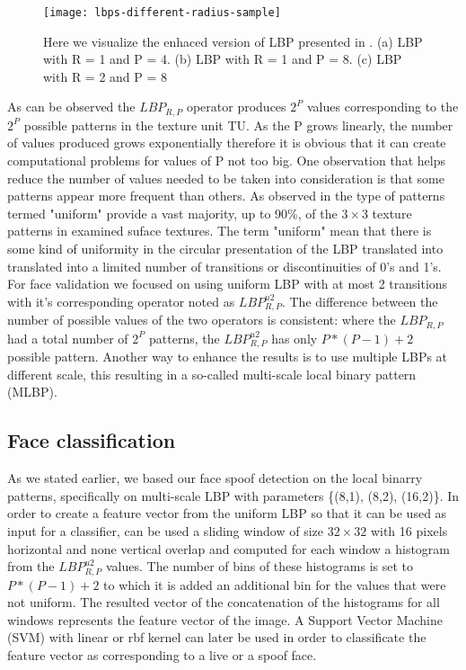 \begin{figure}[h]
	\begin{center}
		\texttt{[image: lbps-different-radius-sample]}
	\end{center}
	\caption[Enhanced LBP visualisation]{Here we visualize the enhaced version of LBP presented in \cite{OjalaPM02}. (a) LBP with R = 1 and P = 4. (b) LBP with R = 1 and P = 8. (c) LBP with R = 2 and P = 8}
\end{figure}
As can be observed the $LBP_{R,P}$ operator produces $2^P$ values corresponding to the $2^P$ possible patterns in the texture unit TU. As the P grows linearly, the number of values produced grows exponentially therefore it is obvious that it can create computational problems for values of P not too big. 
One observation that helps reduce the number of values needed to be taken into consideration is that some patterns appear more frequent than others. As observed in \cite{OjalaPM02} the type of patterns termed "uniform" provide a vast majority, up to 90\%, of the $3\times3$ texture patterns in examined suface textures. The term "uniform" mean that there is some kind of uniformity in the circular presentation of the LBP translated into translated into a limited number of transitions or discontinuities of 0's and 1's. For face validation we focused on using uniform LBP with at most 2 transitions with it's corresponding operator noted as $LBP_{R,P}^{u2}$. The difference between the number of possible values of the two operators is consistent: where the $LBP_{R,P}$ had a total number of $2^P$ patterns, the $LBP_{R,P}^{u2}$ has only $P*(P-1)+2$ possible pattern.
Another way to enhance the results is to use multiple LBPs at different scale, this resulting in a so-called multi-scale local binary pattern (MLBP).

\subsection{Face classification}
As we stated earlier, we based our face spoof detection on the local binarry patterns, specifically on multi-scale LBP with parameters \{(8,1), (8,2), (16,2)\}. In order to create a feature vector from the uniform LBP so that it can be used as input for a classifier, can be used a sliding window of size $32\times32$ with 16 pixels horizontal and none vertical overlap and computed for each window a histogram from the $LBP_{R,P}^{u2}$ values. The number of bins of these histograms is set to $P*(P-1) + 2$ to which it is added an additional bin for the values that were not uniform. The resulted vector of the concatenation of the histograms for all windows represents the feature vector of the image. A Support Vector Machine (SVM) with linear or rbf kernel can later be used in order to classificate the feature vector as corresponding to a live or a spoof face.

